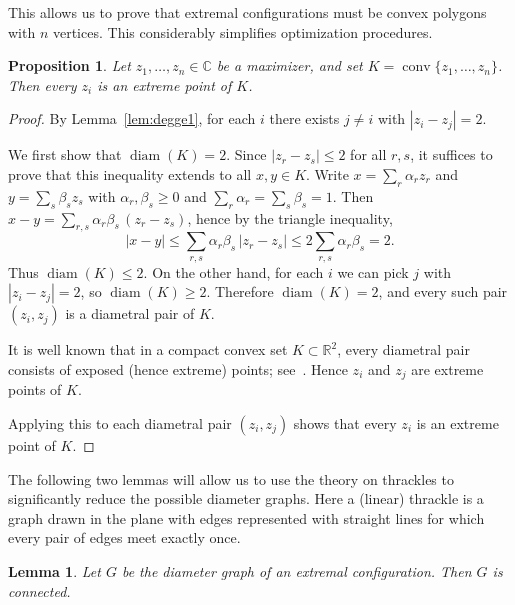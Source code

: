 \documentclass{article}
\DeclareMathOperator{\diam}{diam}
\newtheorem{proposition}[thr]{Proposition}
\newtheorem{lem}[thr]{Lemma}
\theoremstyle{definition}
\let\le\leqslant
\let\ge\geqslant
\begin{document}
This allows us to prove that extremal configurations must be convex polygons with \(n\) vertices.
This considerably simplifies optimization procedures.


\begin{proposition}\label{prop:extreme_point_of_conv_1}
Let $z_1,\dots,z_n\in\mathbb C$ be a maximizer, and set
$K =\operatorname{conv}\{z_1,\dots,z_n\}$.
Then every $z_i$ is an extreme point of $K$.
\end{proposition}

\begin{proof}
By Lemma~\ref{lem:degge1}, for each $i$ there exists $j\ne i$ with $|z_i-z_j|=2$.

We first show that $\diam(K)=2$. Since $|z_r-z_s|\le 2$ for all $r,s$, it suffices to
prove that this inequality extends to all $x,y\in K$.
Write $x=\sum_r \alpha_r z_r$ and $y=\sum_s \beta_s z_s$ with $\alpha_r,\beta_s\ge 0$ and
$\sum_r\alpha_r=\sum_s\beta_s=1$. Then \(x-y=\sum_{r,s}\alpha_r\beta_s\,(z_r-z_s)\), hence by the triangle inequality,
\[
|x-y|\le \sum_{r,s}\alpha_r\beta_s\,|z_r-z_s|
\le 2\sum_{r,s}\alpha_r\beta_s=2.
\]
Thus $\diam(K)\le 2$. On the other hand, for each $i$ we can pick $j$ with $|z_i-z_j|=2$,
so $\diam(K)\ge 2$. Therefore $\diam(K)=2$, and every such pair $(z_i,z_j)$ is a
diametral pair of $K$.

It is well known that in a compact convex set $K\subset\mathbb R^2$, every diametral pair consists of exposed (hence extreme) points; see~\cite[Proposition~1.1(a)]{BrGoMe17}.
Hence $z_i$ and $z_j$ are extreme points of $K$.

Applying this to each diametral pair $(z_i,z_j)$ shows that every $z_i$ is an extreme point
of $K$.
\end{proof}





The following two lemmas will allow us to use the theory on thrackles to significantly reduce the possible  diameter graphs.
Here a (linear) thrackle is a graph drawn in the plane with edges represented with straight lines for which every pair of edges meet exactly once.


\begin{lem}\label{lem:conn}
Let \(G\) be the diameter graph of an extremal configuration.
Then \(G\) is connected.
\end{lem}
\end{document}

